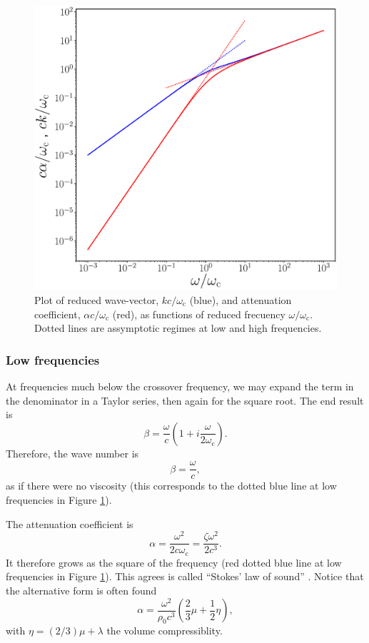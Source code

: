 \begin{figure}
  \centering
  \begin{minipage}{0.7\textwidth}
      \includegraphics[width=\textwidth]{figures/sound_wave_att}
  \end{minipage}
  \caption{Plot of reduced wave-vector, $k c /\omega_\mathrm{c}$ (blue), and
    attenuation coefficient, $\alpha c /\omega_\mathrm{c}$ (red), as functions
    of reduced frecuency $\omega /\omega_\mathrm{c}$. Dotted lines are
    assymptotic regimes at low and high frequencies.
    \label{fig:sound_wave_att}}
\end{figure}


\subsubsection{Low frequencies}


At frequencies much below the crossover frequency, we may expand the
term in the denominator in a Taylor series, then again for the square
root. The end result is
\[
\beta = \frac{\omega}{c} \left(1 + i   \frac{\omega}{2 \omega_\mathrm{c}}\right).
\]
%
Therefore, the wave number is
\[
\beta = \frac{\omega}{c},
\]
as if there were no viscosity (this corresponds to the dotted blue
line at low frequencies in Figure \ref{fig:sound_wave_att}).

The attenuation coefficient is
\[ \alpha = \frac{\omega^2}{2 c\omega_\mathrm{c}}=
\frac{ \zeta \omega^2 }{2 c^3}. \]
%
It therefore grows as the square of the frequency (red dotted blue
line at low frequencies in Figure \ref{fig:sound_wave_att}).  This
agrees is called ``Stokes' law of sound'' . Notice that the alternative form is often found
\cite{kp:SloS}
\[
  \alpha =  \frac{\omega^2}{\rho_0 c^3}
  \left( \frac23 \mu+ \frac12 \eta  \right),
\]
with $\eta= (2/3) \mu + \lambda$ the volume compressiblity.

